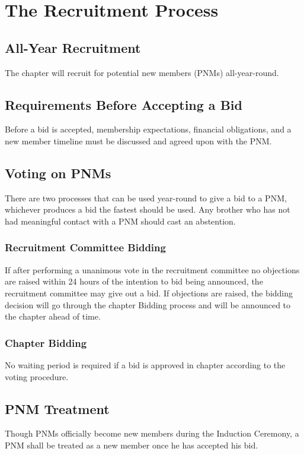 \chapter{The Recruitment Process}
\label{cha:the-recruitment-process}

\section{All-Year Recruitment}
\label{sec:all-year-recruitment}

The chapter will recruit for potential new members (PNMs) all-year-round.

\section{Requirements Before Accepting a Bid}
\label{sec:requirements-before-accepting-a-bid}

Before a bid is accepted, membership expectations, financial obligations, and a
new member timeline must be discussed and agreed upon with the PNM\@.

\section{Voting on PNMs}
\label{sec:voting-on-pnms}

There are two processes that can be used year-round to
give a bid to a PNM, whichever produces a bid the fastest should be used.
Any brother who has not had meaningful contact with a PNM should cast an abstention.

\subsection{Recruitment Committee Bidding}
\label{subsec:recruitment-committee-bidding}

If after performing a unanimous vote in the recruitment committee no objections
are raised within 24 hours of the intention to bid being announced, the
recruitment committee may give out a bid.
If objections are raised, the bidding decision will go through the chapter
Bidding process and will be announced to the chapter ahead of time.

\subsection{Chapter Bidding} 
\label{subsec:chappter-bidding}

No waiting period is required if a bid is approved
in chapter according to the voting procedure.

\section{PNM Treatment}
\label{sec:pnm-treatment}

Though PNMs officially become new members during the Induction Ceremony, a PNM shall be
treated as a new member once he has accepted his bid.
